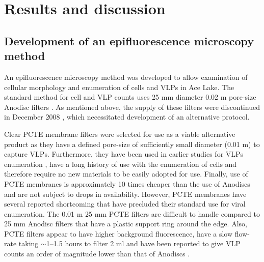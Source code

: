 
\section{Results and discussion}

\subsection[Development of an epifluorescence microscopy method]{Development of an epifluorescence microscopy method}
An epifluorescence microscopy method was developed to allow examination of cellular morphology and enumeration of cells and \acp{VLP} in Ace Lake.
The standard method for cell and \ac{VLP} counts uses 25 mm diameter 0.02 \textmu{}m pore-size Anodisc filters \cite{Patel2007}.
As mentioned above, the supply of these filters were discontinued in December 2008 \cite{Torrice2009}, which necessitated development of an alternative protocol.

Clear \ac{PCTE} membrane filters were selected for use as a viable alternative product as they have a defined pore-size of sufficiently small diameter (0.01 \textmu{}m) to capture \acp{VLP}. 
Furthermore, they have been used in earlier studies for \acp{VLP} enumeration \cite{Hara1991, Proctor1992}, have a long history of use with the enumeration of cells \cite{Hobbie1977} and therefore require no new materials to be easily adopted for use.
Finally, use of \ac{PCTE} membranes is approximately 10 times cheaper than the use of Anodiscs and are not subject to drops in availability.
However, \ac{PCTE} membranes have several reported shortcoming that have precluded their standard use for viral enumeration.
The 0.01 \textmu{}m 25 mm \ac{PCTE} filters are difficult to handle compared to 25 mm Anodisc filters that have a plastic support ring around the edge.
Also, \ac{PCTE} filters appear to have higher background fluorescence, have a slow flow-rate taking $\sim$1--1.5 hours to filter 2 ml \cite{Hara1991} and have been reported to give \ac{VLP} counts an order of magnitude lower than that of Anodiscs \cite{Budinoff2011}.%

